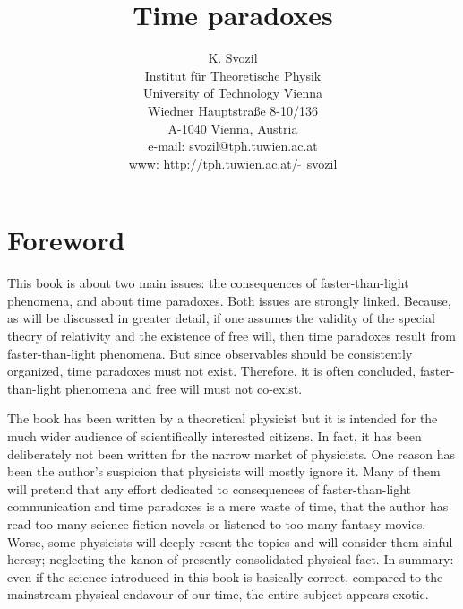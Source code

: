  

\title{Time paradoxes}
\author{K. Svozil\\
 {\small Institut f\"ur Theoretische Physik}  \\
  {\small University of Technology Vienna }     \\
  {\small Wiedner Hauptstra\ss e 8-10/136}    \\
  {\small A-1040 Vienna, Austria   }            \\
  {\small e-mail: svozil@tph.tuwien.ac.at}\\
  {\small www: http://tph.tuwien.ac.at/$\widetilde{\;\;}\,$svozil}}
\date{ }
\maketitle

 \tableofcontents

\chapter*{Foreword}



   This book is about two main issues:  the consequences of faster-than-light
phenomena,  and  about  time  paradoxes.    Both  issues are strongly linked.
Because, as will be discussed in greater detail, if one assumes the  validity
of the special theory of relativity and the existence of free will, then time
paradoxes  result  from  faster-than-light  phenomena.   But since observables
should be consistently organized, time  paradoxes must not exist.   Therefore,
it is  often concluded,  faster-than-light phenomena  and free  will must not
co-exist.


   The book has been  written by a theoretical  physicist but it is  intended
for the much wider audience of scientifically interested citizens.  In  fact,
it  has  been  deliberately  not  been  written  for  the  narrow  market  of
physicists.  One reason has been the author's suspicion that physicists  will
mostly ignore it.   Many of  them will pretend  that any effort  dedicated to
consequences of faster-than-light communication  and time paradoxes is  a mere
waste of time, that  the author has read  too many science fiction  novels or
listened to  too many  fantasy movies.   Worse,  some physicists  will deeply
resent the topics and will consider them sinful heresy; neglecting the  kanon
of presently consolidated physical  fact.  In summary:   even if the  science
introduced in  this book  is basically  correct, compared  to the  mainstream
physical endavour of our time, the entire subject appears exotic.



